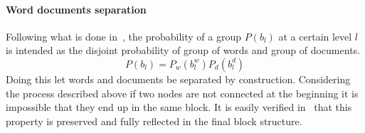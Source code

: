 \paragraph{Word documents separation}
Following what is done in~\cite{gerlach2018network}, the probability of a group $P(b_l)$ at a certain level $l$ is intended as the disjoint probability of
group of words and group of documents.
\begin{equation}
  P(b_l)=P_w(b_l^w)P_d(b_l^d)
\end{equation}
Doing this let words and documents be separated by construction.
Considering the process described above if two nodes are not connected at the beginning it is impossible
that they end up in the same block.
It is easily verified in~\cite{peixoto2014efficient} that this property is preserved and fully reflected in the final block structure.
